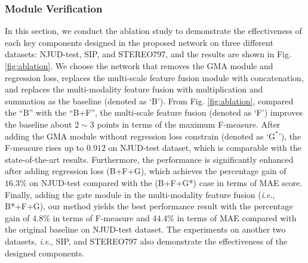 \documentclass[journal]{IEEEtran}
\newcommand{\ie}{\textit{i}.\textit{e}.}
\begin{document}
\subsubsection{\textbf{Module Verification}} In this section, we conduct the ablation study to demonstrate the effectiveness of each key components designed in the proposed network on three different datasets: NJUD-test, SIP, and STEREO797, and the results are shown in Fig. \ref{fig:ablation}. We choose the network that removes the GMA module and regression loss, replaces the multi-scale feature fusion module with concatenation, and replaces the multi-modality feature fusion with multiplication and summation as the baseline (denoted as `B'). From Fig. \ref{fig:ablation}, compared the ``B'' with the ``B+F'', the multi-scale feature fusion (denoted as `F') improves the baseline about $2\sim 3$ points in terms of the maximum F-measure. After adding the GMA module without regression loss constrain (denoted as `$\text{G}^*$'), the F-measure rises up to $0.912$ on NJUD-test dataset, which is comparable with the state-of-the-art results. Furthermore, the performance is significantly enhanced after adding regression loss (B+F+G), which achieves the percentage gain of $16.3\%$ on NJUD-test compared with the (B+F+G*) case in terms of MAE score. Finally, adding the gate module in the multi-modality feature fusion (\ie, B*+F+G), our method yields the best performance result with the percentage gain of $4.8\%$ in terms of F-measure and $44.4\%$ in terms of MAE compared with the original baseline on NJUD-test dataset. The experiments on another two datasets, \ie, SIP, and STEREO797 also demonstrate the effectiveness of the designed components.
\end{document}
